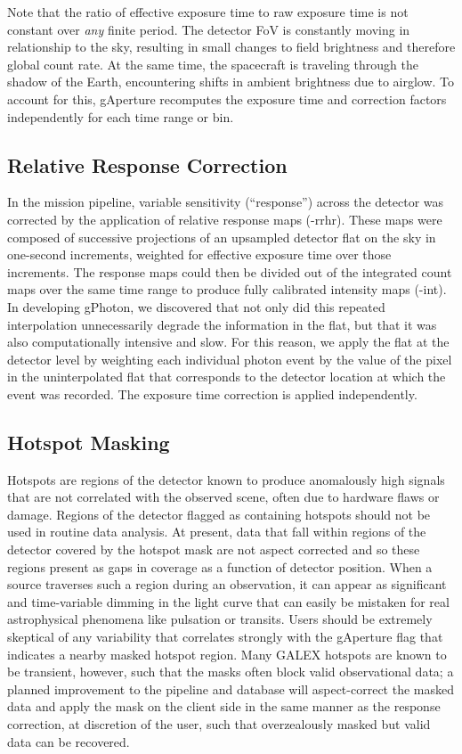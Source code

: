 \documentclass[preprint]{aastex}
\begin{document}
Note that the ratio of effective exposure time to raw exposure time is not constant over \emph{any} finite period. The detector FoV is constantly moving in relationship to the sky, resulting in small changes to field brightness and therefore global count rate. At the same time, the spacecraft is traveling through the shadow of the Earth, encountering shifts in ambient brightness due to airglow. To account for this, gAperture recomputes the exposure time and correction factors independently for each time range or bin.

\subsection{Relative Response Correction}
\label{relresponsecorr}
In the mission pipeline, variable sensitivity (``response'') across the detector was corrected by the application of relative response maps (-rrhr). These maps were composed of successive projections of an upsampled detector flat on the sky in one-second increments, weighted for effective exposure time over those increments. The response maps could then be divided out of the integrated count maps over the same time range to produce fully calibrated intensity maps (-int). In developing gPhoton, we discovered that not only did this repeated interpolation unnecessarily degrade the information in the flat, but that it was also computationally intensive and slow. For this reason, we apply the flat at the detector level by weighting each individual photon event by the value of the pixel in the uninterpolated flat that corresponds to the detector location at which the event was recorded. The exposure time correction is applied independently.

\subsection{Hotspot Masking}
\label{hotspot}
Hotspots are regions of the detector known to produce anomalously high signals that are not correlated with the observed scene, often due to hardware flaws or damage. Regions of the detector flagged as containing hotspots should not be used in routine data analysis. At present, data that fall within regions of the detector covered by the hotspot mask are not aspect corrected and so these regions present as gaps in coverage as a function of detector position. When a source traverses such a region during an observation, it can appear as significant and time-variable dimming in the light curve that can easily be mistaken for real astrophysical phenomena like pulsation or transits. Users should be extremely skeptical of any variability that correlates strongly with the gAperture flag that indicates a nearby masked hotspot region. Many GALEX hotspots are known to be transient, however, such that the masks often block valid observational data; a planned improvement to the pipeline and database will aspect-correct the masked data and apply the mask on the client side in the same manner as the response correction, at discretion of the user, such that overzealously masked but valid data can be recovered.
\end{document}
